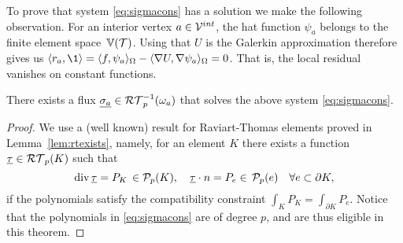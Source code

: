 \documentclass[thesis.tex]{subfiles}
\begin{document}
To prove that system \eqref{eq:sigmacons} has a solution we make the following observation.
For an interior vertex $a \in \mathcal{V}^{int}$, the hat function $\psi_a$ belongs to the finite element space~$\mathbb{V}(\mathcal{T})$. 
Using that $U$ is the Galerkin approximation therefore gives us $\ip{r_a,\1} = \ip{f, \psi_a}_\O - \ip{\nabla U, \nabla \psi_a}_{\O} = 0$.
That is, the local residual vanishes on constant functions.
\begin{thm}
  \label{thm:sigmasolvable}
  There exists a flux $\underline{\sigma_a} \in \mathcal{RT}_{p}^{-1}(\omega_a)$ that solves the above system \eqref{eq:sigmacons}.
\end{thm}
\begin{proof}
  We use a (well known) result for Raviart-Thomas elements proved in Lemma~\ref{lem:rtexists}, namely, 
  for an element $K$ there exists a function $\underline{\tau} \in \mathcal{RT}_p(K)$ such that
  \[
    \operatorname{div} \underline{\tau} = P_K \, \in \mathcal{P}_p(K), \quad \underline{\tau} \cdot n = P_e \in \,\mathcal{P}_p(e) \quad \forall e \subset \partial K,
  \]
  if the polynomials satisfy the compatibility constraint $\int_K P_K = \int_{\partial K} P_e$.
  Notice that the polynomials in \eqref{eq:sigmacons} are of degree $p$, and are thus eligible in this theorem.


\end{proof}
\end{document}
